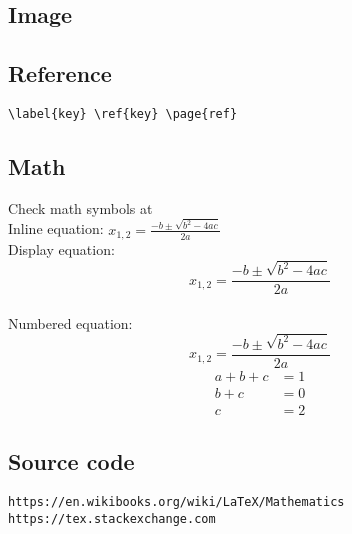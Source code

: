 \documentclass{article}
\newcommand{\site}[2][protocol]{\texttt{#1://#2}}
\begin{document}
\subsection{Image}
\subsection{Reference}
\verb|\label{key} \ref{key} \page{ref}|

\subsection{Math}
Check math symbols at \cite{R01}
\\Inline equation:
\( x_{1,2} = \frac{-b \pm \sqrt{b^2-4ac}}{2a} \)
\\Display equation:
\[ x_{1,2} = \frac{-b \pm \sqrt{b^2-4ac}}{2a} \]
\\Numbered equation:
\begin{equation}
x_{1,2} = \frac{-b \pm \sqrt{b^2-4ac}}{2a}
\end{equation}
\begin{align*}
  a + b + c &= 1\\
  b + c &= 0\\
  c &= 2
\end{align*}

\subsection{Source code}

\begin{thebibliography}{widest label}
   \site[https]{en.wikibooks.org/wiki/LaTeX/Mathematics}
   \site[https]{tex.stackexchange.com}
\end{thebibliography}
\end{document}
